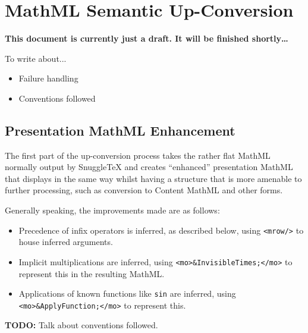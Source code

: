
\section*{MathML Semantic Up-Conversion}

{\bf This document is currently just a draft. It will be finished shortly\ldots}

To write about...

\begin{itemize}
\item Failure handling
\item Conventions followed
\end{itemize}

\subsection*{Presentation MathML Enhancement}

The first part of the up-conversion process takes the rather flat MathML normally
output by SnuggleTeX and creates ``enhanced'' presentation MathML that displays in the
same way whilst having a structure that is more amenable to further processing,
such as conversion to Content MathML and other forms.

Generally speaking, the improvements made are as follows:

\begin{itemize}
\item Precedence of infix operators is inferred, as described below, using
\verb|<mrow/>| to house inferred arguments.
\item Implicit multiplications are inferred, using \verb|<mo>&InvisibleTimes;</mo>|
to represent this in the resulting MathML.
\item Applications of known functions like \verb|sin| are inferred, using
\verb|<mo>&ApplyFunction;</mo>| to represent this.
\end{itemize}

\textbf{TODO:} Talk about conventions followed.

